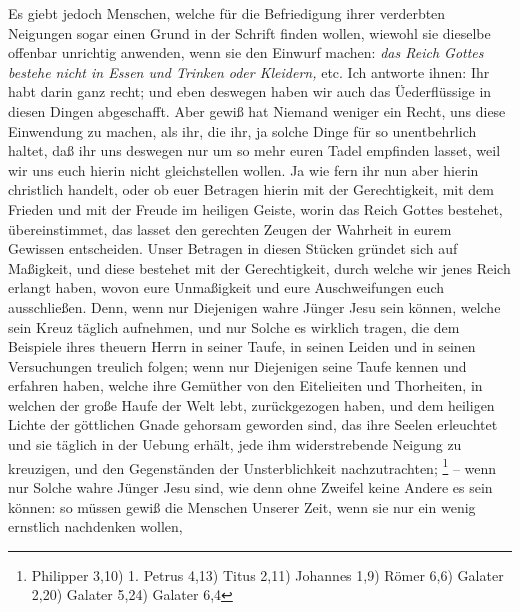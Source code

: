  Es giebt jedoch Menschen, welche für die Befriedigung ihrer verderbten Neigungen
sogar einen Grund in der Schrift finden wollen, wiewohl sie dieselbe offenbar
unrichtig anwenden, wenn sie den Einwurf machen:
\textit{das Reich Gottes bestehe nicht
in Essen und Trinken oder Kleidern,} etc. Ich antworte ihnen: Ihr habt darin ganz
recht; und eben deswegen haben wir auch das Üederflüssige in diesen Dingen
abgeschafft. Aber gewiß hat Niemand weniger ein Recht, uns diese Einwendung zu
machen, als ihr, die ihr, ja solche Dinge für so unentbehrlich haltet, daß ihr
uns deswegen nur um so mehr euren Tadel empfinden lasset, weil wir uns euch
hierin nicht gleichstellen wollen. Ja wie fern ihr nun aber hierin christlich
handelt, oder ob euer Betragen hierin mit der Gerechtigkeit, mit dem Frieden und
mit der Freude im heiligen Geiste, worin das
Reich Gottes bestehet,
übereinstimmet, das lasset den gerechten Zeugen der Wahrheit in eurem Gewissen
entscheiden. Unser Betragen in diesen Stücken gründet sich auf Maßigkeit, und
diese bestehet mit der Gerechtigkeit, durch welche wir jenes Reich erlangt
haben, wovon eure Unmaßigkeit und eure Auschweifungen euch ausschließen. Denn,
wenn nur Diejenigen wahre Jünger Jesu sein können, welche sein Kreuz täglich
aufnehmen, und nur Solche es wirklich tragen, die dem Beispiele ihres theuern
Herrn in seiner Taufe, in seinen Leiden und in seinen Versuchungen treulich
folgen; wenn nur Diejenigen seine Taufe kennen und erfahren haben, welche ihre
Gemüther von den Eitelieiten und Thorheiten, in welchen der große Haufe der Welt
lebt, zurückgezogen haben, und dem heiligen Lichte der göttlichen Gnade gehorsam
geworden sind, das ihre Seelen erleuchtet und sie täglich in der Uebung erhält,
jede ihm widerstrebende Neigung zu kreuzigen, und den Gegenständen der
Unsterblichkeit nachzutrachten;
\footnote{Philipper 3,10)
1. Petrus 4,13)
Titus 2,11)
Johannes 1,9)
Römer 6,6)
Galater 2,20)
Galater 5,24)
Galater 6,4}
-- wenn nur Solche wahre Jünger
Jesu sind, wie denn ohne Zweifel keine Andere es sein können: so müssen gewiß
die Menschen Unserer Zeit, wenn sie nur ein wenig ernstlich nachdenken wollen,
